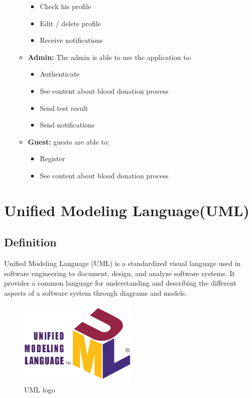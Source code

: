 \begin{itemize}
\begin{itemize}
\begin{itemize}
\item  Check his profile
\item  Edit / delete profile
\item  Receive notifications
\end{itemize}
\item \textbf{Admin:}  The admin is able to use the application to:
\begin{itemize}
\item  Authenticate 
\item  See content about blood donation process
\item Send test result
\item  Send notifications
\end{itemize}
\item \textbf{Guest:}  guests are able to:
\begin{itemize}
\item  Register 
\item  See content about blood donation process
\end{itemize}
\end{itemize}
\end{itemize}


\section{Unified Modeling Language(UML)}


\subsection{Definition}
Unified Modeling Language (UML) is a standardized visual language used in software engineering to document, design, and analyze software systems. It provides a common language for understanding and describing the different aspects of a software system through diagrams and models.

\begin{figure}[H]
    \centering
    \includegraphics[width=0.5\textwidth]{images/UML_logo.svg.png}
    \caption{UML logo}
    \label{fig:figure4}
\end{figure}
